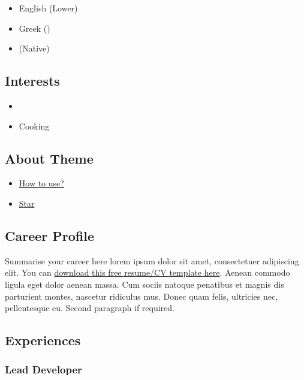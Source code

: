 \documentclass[english,]{article}
\providecommand{\tightlist}{%
  \setlength{\itemsep}{0pt}\setlength{\parskip}{0pt}}
\begin{document}
\begin{itemize}
\tightlist
\item
  English {(Lower)}
\item
  Greek {()}
\item
  {(Native)}
\end{itemize}

\hypertarget{interests}{%
\subsection{Interests}\label{interests}}

\begin{itemize}
\item
\item
  Cooking
\end{itemize}

\hypertarget{about-theme}{%
\subsection{About Theme}\label{about-theme}}

\begin{itemize}
\tightlist
\item
  \href{https://www.youtube.com/watch?v=Jnmj1dXDbNk}{How to use?}
\item
  \href{https://github.com/sharu725/online-cv}{Star}
\end{itemize}

\hypertarget{career-profile}{%
\subsection{\texorpdfstring{{ \emph{} \emph{} } Career
Profile}{    Career Profile}}\label{career-profile}}

Summarise your career here lorem ipsum dolor sit amet, consectetuer
adipiscing elit. You can \href{}{download this free resume/CV template
here}. Aenean commodo ligula eget dolor aenean massa. Cum sociis natoque
penatibus et magnis dis parturient montes, nascetur ridiculus mus. Donec
quam felis, ultricies nec, pellentesque eu. Second paragraph if
required.

\hypertarget{experiences}{%
\subsection{\texorpdfstring{{ \emph{} \emph{} }
Experiences}{    Experiences}}\label{experiences}}

\hypertarget{lead-developer}{%
\subsubsection{Lead Developer}\label{lead-developer}}
\end{document}
